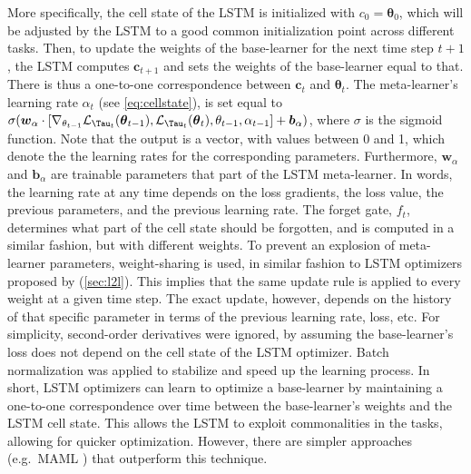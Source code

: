 More specifically, the cell state of the LSTM is initialized with $c_{0} = \boldsymbol{\theta}_{0}$, which will be adjusted by the LSTM to a good common initialization point across different tasks. 
Then, to update the weights of the base-learner for the next time step $t+1$, the LSTM computes $\boldsymbol{c}_{t+1}$ and sets the weights of the base-learner equal to that. 
There is thus a one-to-one correspondence between $\boldsymbol{c}_{t}$ and $\boldsymbol{\theta}_{t}$. The meta-learner's learning rate $\alpha_{t}$ (see \autoref{eq:cellstate}), is set equal to $\sigma(\boldsymbol{w}_{\alpha} \cdot [\nabla_{\theta_{t-1}} \mathcal{L}_{\Tau_{t}}(\boldsymbol{\theta}_{t-1}), \mathcal{L}_{\Tau_{t}}(\boldsymbol{\theta}_{t}), \theta_{t-1}, \alpha_{t-1}] + \boldsymbol{b}_{\alpha})$, where $\sigma$ is the sigmoid function. Note that the output is a vector, with values between 0 and 1, which denote the the learning rates for the corresponding parameters. Furthermore, $\boldsymbol{w}_{\alpha}$ and $\boldsymbol{b}_{\alpha}$ are trainable parameters that part of the LSTM meta-learner. In words, the learning rate at any time depends on the loss gradients, the loss value, the previous parameters, and the previous learning rate. The forget gate, $f_{t}$, determines what part of the cell state should be forgotten, and is computed in a similar fashion, but with different weights.
To prevent an explosion of meta-learner parameters, weight-sharing is used, in similar fashion to LSTM optimizers proposed by  (\autoref{sec:l2l}). This implies that the same update rule is applied to every weight at a given time step. The exact update, however, depends on the history of that specific parameter in terms of the previous learning rate, loss, etc. For simplicity, second-order derivatives were ignored, by assuming the base-learner's loss does not depend on the cell state of the LSTM optimizer. Batch normalization was applied to stabilize and speed up the learning process.  
In short, LSTM optimizers can learn to optimize a base-learner by maintaining a one-to-one correspondence over time between the base-learner's weights and the LSTM cell state. This allows the LSTM to exploit commonalities in the tasks, allowing for quicker optimization. However, there are simpler approaches (e.g.\ MAML ) that outperform this technique.

